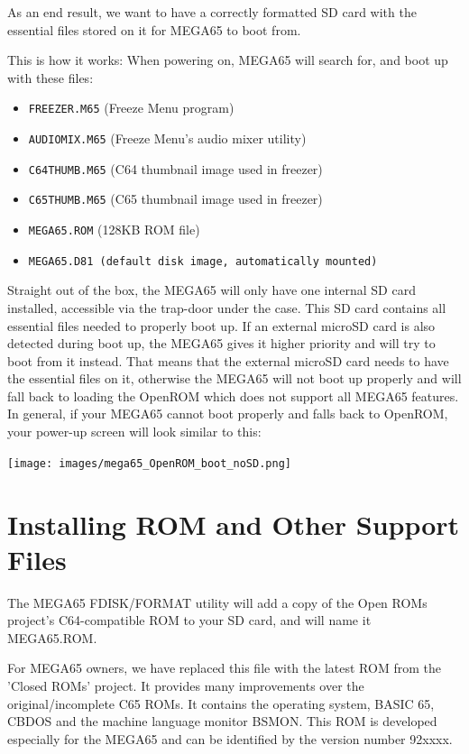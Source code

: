 As an end result, we want to have a correctly formatted SD card with the essential files stored on it for MEGA65 to boot from.

This is how it works: When powering on, MEGA65 will search for, and boot up with these files:
\begin{itemize}
\item {\tt FREEZER.M65} (Freeze Menu program)
\item {\tt AUDIOMIX.M65} (Freeze Menu's audio mixer utility)
\item {\tt C64THUMB.M65} (C64 thumbnail image used in freezer)
\item {\tt C65THUMB.M65} (C65 thumbnail image used in freezer)
\item {\tt MEGA65.ROM}   (128KB ROM file)
\item {\tt MEGA65.D81 (default disk image, automatically mounted)}
\end{itemize}

Straight out of the box, the MEGA65 will only have one internal SD card installed, accessible via the trap-door under the case. This SD card contains all essential files needed to properly boot up.
If an external microSD card is also detected during boot up, the MEGA65 gives it higher priority and will try to boot from it instead.
That means that the external microSD card needs to have the essential files on it, otherwise the MEGA65 will not boot up properly and will fall back to loading the OpenROM which does not support all MEGA65 features.
In general, if your MEGA65 cannot boot properly and falls back to OpenROM, your power-up screen will look similar to this:

\texttt{[image: images/mega65\_OpenROM\_boot\_noSD.png]}


\section{Installing ROM and Other Support Files}
\label{sec:installingrometc}

The MEGA65 FDISK/FORMAT utility will add a copy of the Open ROMs project's C64-compatible ROM
to your SD card, and will name it MEGA65.ROM.

For MEGA65 owners, we have replaced this file with the latest ROM from the 'Closed ROMs'
project. It provides many improvements over the original/incomplete C65 ROMs. It contains
the operating system, BASIC 65, CBDOS and the machine language monitor BSMON.
This ROM is developed especially for the MEGA65 and can be
identified by the version number 92xxxx.

